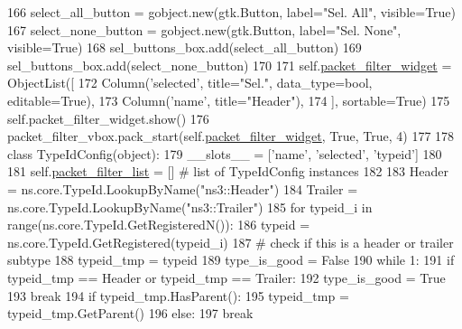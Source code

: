 \begin{DoxyCode}
{166         select\_all\_button = gobject.new(gtk.Button, label=\textcolor{stringliteral}{"Sel. All"}, visible=\textcolor{keyword}{True})
167         select\_none\_button = gobject.new(gtk.Button, label=\textcolor{stringliteral}{"Sel. None"}, visible=\textcolor{keyword}{True})
168         sel\_buttons\_box.add(select\_all\_button)
169         sel\_buttons\_box.add(select\_none\_button)
170 
171         self.\hyperlink{classshow__last__packets_1_1ShowLastPackets_ad9cc838d0891495e59911fb9824c2757}{packet\_filter\_widget} = ObjectList([
172                 Column(\textcolor{stringliteral}{'selected'}, title=\textcolor{stringliteral}{"Sel."}, data\_type=bool, editable=\textcolor{keyword}{True}),
173                 Column(\textcolor{stringliteral}{'name'}, title=\textcolor{stringliteral}{"Header"}),
174                 ], sortable=\textcolor{keyword}{True})
175         self.packet\_filter\_widget.show()
176         packet\_filter\_vbox.pack\_start(self.\hyperlink{classshow__last__packets_1_1ShowLastPackets_ad9cc838d0891495e59911fb9824c2757}{packet\_filter\_widget}, \textcolor{keyword}{True}, \textcolor{keyword}{True}, 4)
177 
178         \textcolor{keyword}{class }TypeIdConfig(object):
179             \_\_slots\_\_ = [\textcolor{stringliteral}{'name'}, \textcolor{stringliteral}{'selected'}, \textcolor{stringliteral}{'typeid'}]
180 
181         self.\hyperlink{classshow__last__packets_1_1ShowLastPackets_afb948244d0751d3a493657bb1b3af47f}{packet\_filter\_list} = [] \textcolor{comment}{# list of TypeIdConfig instances}
182 
183         Header = ns.core.TypeId.LookupByName(\textcolor{stringliteral}{"ns3::Header"})
184         Trailer = ns.core.TypeId.LookupByName(\textcolor{stringliteral}{"ns3::Trailer"})
185         \textcolor{keywordflow}{for} typeid\_i \textcolor{keywordflow}{in} range(ns.core.TypeId.GetRegisteredN()):
186             typeid = ns.core.TypeId.GetRegistered(typeid\_i)
187             \textcolor{comment}{# check if this is a header or trailer subtype}
188             typeid\_tmp = typeid
189             type\_is\_good = \textcolor{keyword}{False}
190             \textcolor{keywordflow}{while} 1:
191                 \textcolor{keywordflow}{if} typeid\_tmp == Header \textcolor{keywordflow}{or} typeid\_tmp == Trailer:
192                     type\_is\_good = \textcolor{keyword}{True}
193                     \textcolor{keywordflow}{break}
194                 \textcolor{keywordflow}{if} typeid\_tmp.HasParent():
195                     typeid\_tmp = typeid\_tmp.GetParent()
196                 \textcolor{keywordflow}{else}:
197                     \textcolor{keywordflow}{break}
}
\end{DoxyCode}
